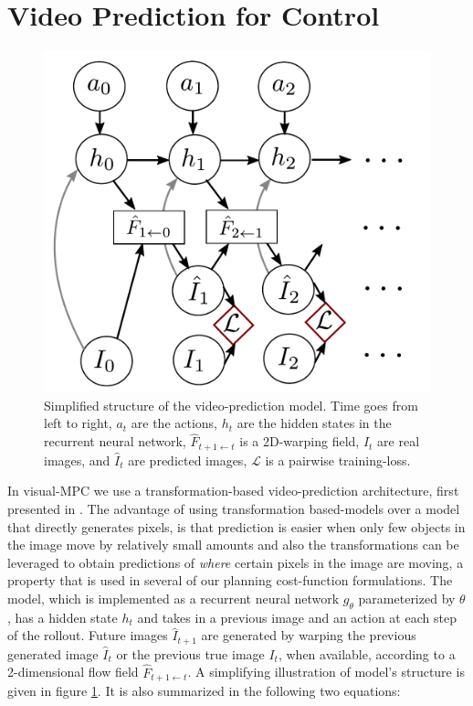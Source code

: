 \section{Video Prediction for Control}
\label{sec:model}

\begin{figure}[t]
	\centering
	\includegraphics[width=0.7\columnwidth]{images_general/prediction_model.pdf}
	\caption{\small{Simplified structure of the video-prediction model. Time goes from left to right, $a_t$ are the actions, $h_t$ are the hidden states in the recurrent neural network, $\hat{F}_{t+1 \leftarrow t}$ is a 2D-warping field, $I_t$ are real images, and $\hat{I}_t$ are predicted images, $\mathcal{L}$ is a pairwise training-loss. }}   
	\label{fig:prediction_model}
\end{figure}

In visual-MPC we use a transformation-based video-prediction architecture, first presented in \cite{finn_nips}. The advantage of using transformation based-models over a model that directly generates pixels, is that prediction is easier when only few objects in the image move by relatively small amounts and also the transformations can be leveraged to obtain predictions of \emph{where} certain pixels in the image are moving, a property that is used in several of our planning cost-function formulations. The model, which is implemented as a recurrent neural network $g_{\theta}$ parameterized by $\theta$, has a hidden state $h_t$ and takes in a previous image and an action at each step of the rollout. Future images $\hat{I}_{t+1}$ are generated by warping the previous generated image $\hat{I}_t$ or the previous true image $I_t$, when available, according to a 2-dimensional flow field $\hat{F}_{t+1 \leftarrow t}$. A simplifying illustration of model's structure is given in figure \ref{fig:prediction_model}. It is also summarized in the following two equations:

